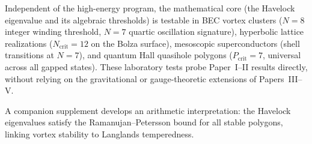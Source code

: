 Independent of the high-energy program, the mathematical
core (the Havelock eigenvalue and its algebraic thresholds) is
testable in BEC vortex clusters ($N = 8$ integer winding
threshold, $N = 7$ quartic oscillation signature),
hyperbolic lattice realizations ($N_{\mathrm{crit}} = 12$
on the Bolza surface), mesoscopic superconductors
(shell transitions at $N = 7$), and quantum Hall quasihole
polygons ($P_{\mathrm{crit}} = 7$, universal across all
gapped states).
These laboratory tests probe Paper~I--II results directly,
without relying on the gravitational or gauge-theoretic
extensions of Papers~III--V.

A companion supplement develops an arithmetic interpretation:
the Havelock eigenvalues satisfy the Ramanujan--Petersson
bound for all stable polygons, linking vortex stability
to Langlands temperedness.





